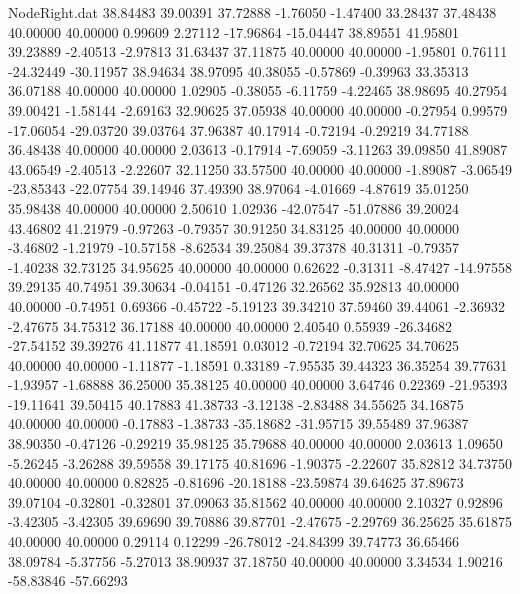 \begin{filecontents}{NodeRight.dat}
  38.84483   39.00391   37.72888    -1.76050   -1.47400   33.28437   37.48438   40.00000   40.00000    0.99609    2.27112  -17.96864  -15.04447
  38.89551   41.95801   39.23889    -2.40513   -2.97813   31.63437   37.11875   40.00000   40.00000   -1.95801    0.76111  -24.32449  -30.11957
  38.94634   38.97095   40.38055    -0.57869   -0.39963   33.35313   36.07188   40.00000   40.00000    1.02905   -0.38055   -6.11759   -4.22465
  38.98695   40.27954   39.00421    -1.58144   -2.69163   32.90625   37.05938   40.00000   40.00000   -0.27954    0.99579  -17.06054  -29.03720
  39.03764   37.96387   40.17914    -0.72194   -0.29219   34.77188   36.48438   40.00000   40.00000    2.03613   -0.17914   -7.69059   -3.11263
  39.09850   41.89087   43.06549    -2.40513   -2.22607   32.11250   33.57500   40.00000   40.00000   -1.89087   -3.06549  -23.85343  -22.07754
  39.14946   37.49390   38.97064    -4.01669   -4.87619   35.01250   35.98438   40.00000   40.00000    2.50610    1.02936  -42.07547  -51.07886
  39.20024   43.46802   41.21979    -0.97263   -0.79357   30.91250   34.83125   40.00000   40.00000   -3.46802   -1.21979  -10.57158   -8.62534
  39.25084   39.37378   40.31311    -0.79357   -1.40238   32.73125   34.95625   40.00000   40.00000    0.62622   -0.31311   -8.47427  -14.97558
  39.29135   40.74951   39.30634    -0.04151   -0.47126   32.26562   35.92813   40.00000   40.00000   -0.74951    0.69366   -0.45722   -5.19123
  39.34210   37.59460   39.44061    -2.36932   -2.47675   34.75312   36.17188   40.00000   40.00000    2.40540    0.55939  -26.34682  -27.54152
  39.39276   41.11877   41.18591     0.03012   -0.72194   32.70625   34.70625   40.00000   40.00000   -1.11877   -1.18591    0.33189   -7.95535
  39.44323   36.35254   39.77631    -1.93957   -1.68888   36.25000   35.38125   40.00000   40.00000    3.64746    0.22369  -21.95393  -19.11641
  39.50415   40.17883   41.38733    -3.12138   -2.83488   34.55625   34.16875   40.00000   40.00000   -0.17883   -1.38733  -35.18682  -31.95715
  39.55489   37.96387   38.90350    -0.47126   -0.29219   35.98125   35.79688   40.00000   40.00000    2.03613    1.09650   -5.26245   -3.26288
  39.59558   39.17175   40.81696    -1.90375   -2.22607   35.82812   34.73750   40.00000   40.00000    0.82825   -0.81696  -20.18188  -23.59874
  39.64625   37.89673   39.07104    -0.32801   -0.32801   37.09063   35.81562   40.00000   40.00000    2.10327    0.92896   -3.42305   -3.42305
  39.69690   39.70886   39.87701    -2.47675   -2.29769   36.25625   35.61875   40.00000   40.00000    0.29114    0.12299  -26.78012  -24.84399
  39.74773   36.65466   38.09784    -5.37756   -5.27013   38.90937   37.18750   40.00000   40.00000    3.34534    1.90216  -58.83846  -57.66293

\end{filecontents}

